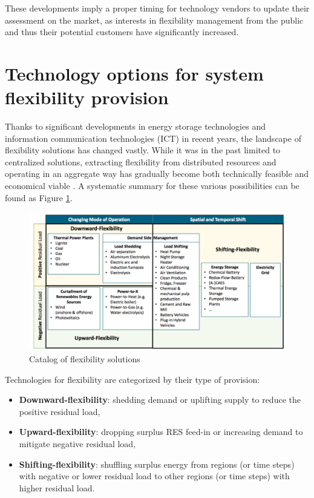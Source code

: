 These developments imply a proper timing for technology vendors to update their assessment on the market, as interests in flexibility management from the public and thus their potential customers have significantly increased.

\section{Technology options for system flexibility provision}

Thanks to significant developments in energy storage technologies and information communication technologies (ICT) in recent years, the landscape of flexibility solutions has changed vastly. While it was in the past limited to centralized solutions, extracting flexibility from distributed resources and operating in an aggregate way has gradually become both technically feasible and economical viable \cite{Cochran2014,Wang2017,Lund2015,Muller2016}. A systematic summary for these various possibilities can be found as Figure \ref{fig:TechnologyOptions}.

\begin{figure}[h!]
	\centering
	\includegraphics[width=0.95\linewidth]{Figures/TechnologyOptions}
	\caption{Catalog of flexibility solutions \cite{Muller2016}}
	\label{fig:TechnologyOptions}
\end{figure}

Technologies for flexibility are categorized by their type of provision:

\begin{itemize}
	\item \textbf{Downward-flexibility}: shedding demand or uplifting supply to reduce the positive residual load,
	\item \textbf{Upward-flexibility}: dropping surplus RES feed-in or increasing demand to mitigate negative residual load,
	\item  \textbf{Shifting-flexibility}: shuffling surplus energy from regions (or time steps) with negative or lower residual load to other regions (or time steps) with higher residual load.
\end{itemize}

